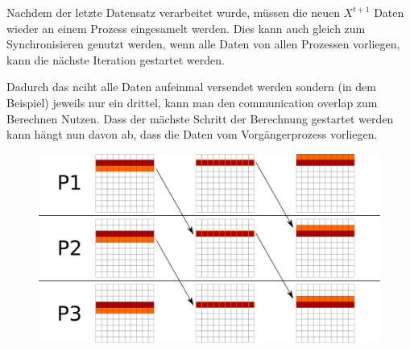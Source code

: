 \documentclass[a4paper,11pt]{scrartcl}
\begin{document}
Nachdem der letzte Datensatz verarbeitet wurde, müssen die neuen $X^{t+1}$ Daten wieder an einem Prozess eingesamelt werden. Dies kann auch gleich zum Synchronisieren genutzt werden, wenn alle Daten von allen Prozessen vorliegen, kann die nächste Iteration gestartet werden. 

Dadurch das nciht alle Daten aufeinmal versendet werden sondern (in dem Beispiel) jeweils nur ein drittel, kann man den communication overlap zum Berechnen Nutzen. Dass der mächste Schritt der Berechnung gestartet werden kann hängt nun davon ab, dass die Daten vom Vorgängerprozess vorliegen.\\ 

\begin{figure}[htbp]
\includegraphics[width=0.7\linewidth,
keepaspectratio]{decomp2.png}
\centering
\end{figure}
\end{document}
